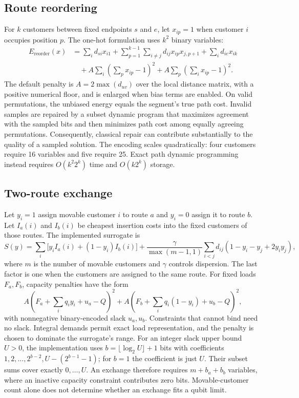 \documentclass[11pt,a4paper]{article}
\begin{document}
\subsection{Route reordering}

For $k$ customers between fixed endpoints $s$ and $e$, let $x_{ip}=1$ when
customer $i$ occupies position $p$. The one-hot formulation uses $k^2$ binary
variables:
\begin{align}
 E_{\mathrm{reorder}}(x)
 &=\sum_i d_{si}x_{i1}
   +\sum_{p=1}^{k-1}\sum_{i\ne j}d_{ij}x_{ip}x_{j,p+1}
   +\sum_i d_{ie}x_{ik} \nonumber\\
 &\quad+A\sum_i\left(\sum_p x_{ip}-1\right)^2
       +A\sum_p\left(\sum_i x_{ip}-1\right)^2.
 \label{eq:reorder}
\end{align}
The default penalty is $A=2\max(d_{uv})$ over the local distance matrix,
with a positive numerical floor, and is enlarged when
bias terms are enabled. On valid permutations, the unbiased energy equals
the segment's true path cost. Invalid samples are repaired by a subset dynamic
program that maximizes agreement with the sampled bits and then minimizes
path cost among equally agreeing permutations. Consequently, classical repair
can contribute substantially to the quality of a sampled solution.
The encoding scales quadratically: four customers require 16 variables
and five require 25. Exact path dynamic programming instead requires
$O(k^2 2^k)$ time and $O(k2^k)$ storage.

\subsection{Two-route exchange}

Let $y_i=1$ assign movable customer $i$ to route $a$ and $y_i=0$ assign it to
route $b$. Let $I_a(i)$ and $I_b(i)$ be cheapest insertion costs into the
fixed customers of those routes. The implemented surrogate is
\begin{equation}
 S(y)=\sum_i\bigl[y_iI_a(i)+(1-y_i)I_b(i)\bigr]
 +\frac{\gamma}{\max(m-1,1)}\sum_{i<j}d_{ij}
       (1-y_i-y_j+2y_iy_j),
 \label{eq:exchange}
\end{equation}
where $m$ is the number of movable customers and $\gamma$ controls dispersion.
The last factor is one when the customers are assigned to the same route.
For fixed loads $F_a,F_b$, capacity penalties have the form
\begin{equation}
 A\left(F_a+\sum_i q_i y_i+u_a-Q\right)^2
 +A\left(F_b+\sum_i q_i(1-y_i)+u_b-Q\right)^2,
\end{equation}
with nonnegative binary-encoded slack $u_a,u_b$. Constraints that cannot bind
need no slack. Integral demands permit exact load representation, and the
penalty is chosen to dominate the surrogate's range.
For an integer slack upper bound $U>0$, the implementation uses
$b=\lfloor\log_2 U\rfloor+1$ bits with coefficients
$1,2,\ldots,2^{b-2},U-(2^{b-1}-1)$; for $b=1$ the coefficient is
just $U$. Their subset sums cover exactly $0,\ldots,U$.
An exchange therefore requires $m+b_a+b_b$ variables, where an inactive
capacity constraint contributes zero bits. Movable-customer count alone
does not determine whether an exchange fits a qubit limit.
\end{document}
